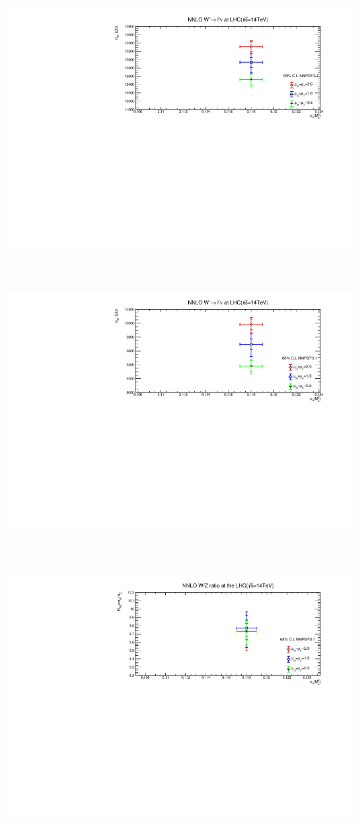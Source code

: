 \begin{figure}[H]
\centering
\begin{subfigure}{0.48\textwidth}
\includegraphics[height=7cm ,width=\textwidth]{chapter4/compwp14.pdf}
\vspace*{-8mm}
\caption{}
\label{wp14rf}
\end{subfigure}
\begin{subfigure}{0.49\textwidth}
\includegraphics[height=7cm, width=\textwidth]{chapter4/compwm14.pdf}
\vspace*{-8mm}
\caption{}
\label{wm14rf}
\end{subfigure}
\begin{subfigure}{0.49\textwidth}
\includegraphics[height=7cm, width=\textwidth]{chapter4/Rwz14RF_68.pdf}

\end{subfigure}
\end{figure}
